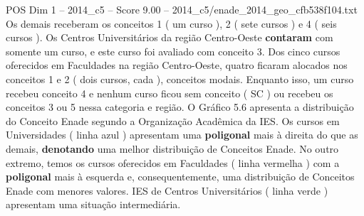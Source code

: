 \begin{textsample}{POS Dim 1 – 2014\_c5 – Score 9.00 – 2014\_c5/enade\_2014\_geo\_cfb538f104.txt}
Os demais receberam os conceitos 1 ( um curso ), 2 ( sete cursos ) e 4 ( seis cursos ).
Os Centros Universitários da região Centro-Oeste \textbf{contaram} com somente um curso, e este curso foi avaliado com conceito 3.
Dos cinco cursos oferecidos em Faculdades na região Centro-Oeste, quatro ficaram alocados nos conceitos 1 e 2 ( dois cursos, cada ), conceitos modais.
Enquanto isso, um curso recebeu conceito 4 e nenhum curso ficou sem conceito ( SC ) ou recebeu os conceitos 3 ou 5 nessa categoria e região.
O Gráfico 5.6 apresenta a distribuição do Conceito Enade segundo a Organização Acadêmica da IES.
Os cursos em Universidades ( linha azul ) apresentam uma \textbf{poligonal} mais à direita do que as demais, \textbf{denotando} uma melhor distribuição de Conceitos Enade.
No outro extremo, temos os cursos oferecidos em Faculdades ( linha vermelha ) com a \textbf{poligonal} mais à esquerda e, consequentemente, uma distribuição de Conceitos Enade com menores valores.
IES de Centros Universitários ( linha verde ) apresentam uma situação intermediária.

\end{textsample}
